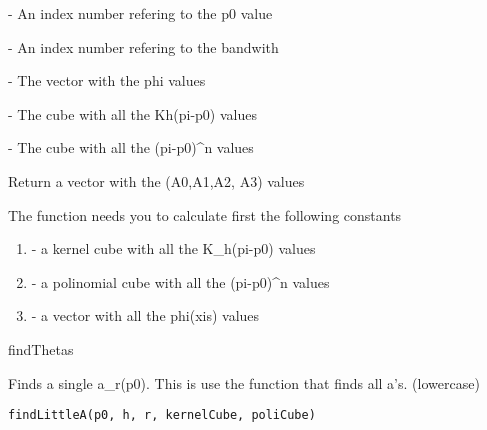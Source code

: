 \documentclass[letterpaper]{book}
\begin{document}
%
\begin{Arguments}
\begin{ldescription}
\item[\code{p0Index}] - An index number refering to the p0 value

\item[\code{hIndex}] - An index number refering to the bandwith

\item[\code{phiVector}] - The vector with the phi values

\item[\code{kernelCube}] - The cube with all the Kh(pi-p0) values

\item[\code{poliCube}] - The cube with all the (pi-p0)\textasciicircum{}n values
\end{ldescription}
\end{Arguments}
%
\begin{Value}
Return a vector with the (A0,A1,A2, A3) values
\end{Value}
%
\begin{Note}\relax
The function needs you to calculate first the following constants

\begin{enumerate}

\item{} - a kernel cube with all the K\_h(pi-p0) values
\item{} - a polinomial cube with all the (pi-p0)\textasciicircum{}n values
\item{} - a vector with all the phi(xis) values

\end{enumerate}

\end{Note}
%
\begin{SeeAlso}\relax
findThetas
\end{SeeAlso}
%
\begin{Description}\relax
Finds a single a\_r(p0). This is use the function that finds all a's. (lowercase)
\end{Description}
%
\begin{Usage}
\begin{verbatim}
findLittleA(p0, h, r, kernelCube, poliCube)
\end{verbatim}
\end{Usage}
%
\end{document}
